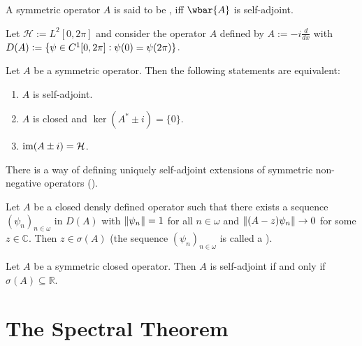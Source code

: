 \begin{definition}
	A symmetric operator $A$ is said to be , iff $\wbar{A}$ is self-adjoint.
\end{definition}

\begin{example}
	Let $\mathcal{H} := L^2[0,2\pi]$ and consider the operator $A$ defined by $A := -i\frac{d}{dx}$ with $D(A) := \cbr[0]{\psi \in C^1[0,2\pi] : \psi(0) = \psi(2\pi)}$.
\end{example}

\begin{theorem}
	Let $A$ be a symmetric operator. Then the following statements are equivalent:
	\begin{enumerate}[label = \textup{(}\alph*\textup{)},wide = 0pt]
		\item $A$ is self-adjoint.
		\item $A$ is closed and $\ker(A^* \pm i) = \{0\}$.
		\item $\operatorname{im}(A \pm i) = \mathcal{H}$.
	\end{enumerate}
\end{theorem}

There is a way of defining uniquely self-adjoint extensions of symmetric non-negative operators ().

\begin{lemma}
	Let $A$ be a closed densly defined operator such that there exists a sequence $(\psi_n)_{n \in \omega}$ in $D(A)$ with $\norm[0]{\psi_n} = 1$ for all $n \in \omega$ and $\norm[0]{(A - z)\psi_n} \to 0$ for some $z \in \mathbb{C}$. Then $z \in \sigma(A)$ (the sequence $(\psi_n)_{n \in \omega}$ is called a ).
\end{lemma}

\begin{theorem}
	Let $A$ be a symmetric closed operator. Then $A$ is self-adjoint if and only if $\sigma(A) \subseteq \mathbb{R}$.
\end{theorem}

\section*{The Spectral Theorem}

